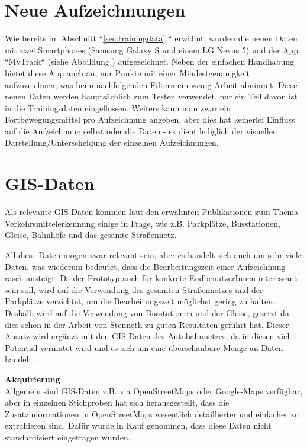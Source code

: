 \section{Neue Aufzeichnungen}
Wie bereits im Abschnitt ``\ref{sec:trainingdata} `` erwähnt, wurden die neuen Daten mit zwei Smartphones (Samsung Galaxy S und einem LG Nexus 5) und der App ``MyTrack`` (siehe Abbildung ) aufgezeichnet. Neben der einfachen Handhabung bietet diese App auch an, nur Punkte mit einer Mindestgenauigkeit aufzuzeichnen, was beim nachfolgenden Filtern ein wenig Arbeit abnimmt. Diese neuen Daten werden hauptsächlich zum Testen verwendet, nur ein Teil davon ist in die Trainingsdaten eingeflossen. Weiters kann man zwar ein Fortbewegungsmittel pro Aufzeichnung angeben, aber dies hat keinerlei Einfluss auf die Aufzeichnung selbst oder die Daten - es dient lediglich der visuellen Darstellung/Unterscheidung der einzelnen Aufzeichnungen.


\section{GIS-Daten}
Als relevante GIS-Daten kommen laut den erwähnten Publikationen zum Thema Verkehrsmittelerkennung einige in Frage, wie z.B. Parkplätze, Busstationen, Gleise, Bahnhöfe und das gesamte Straßennetz. 

All diese Daten mögen zwar relevant sein, aber es handelt sich auch um sehr viele Daten, was wiederum bedeutet, dass die Bearbeitungszeit einer Aufzeichnung rasch ansteigt. Da der Prototyp auch für konkrete EndbenutzerInnen interessant sein soll, wird auf die Verwendung des gesamten Straßennetzes und der Parkplätze verzichtet, um die Bearbeitungszeit möglichst gering zu halten. Deshalb wird auf die Verwendung von Busstationen und der Gleise, gesetzt da dies schon in der Arbeit von Stenneth \cite{stenneth_transportation_2011} zu guten Resultaten geführt hat. Dieser Ansatz wird ergänzt mit den GIS-Daten des Autobahnnetzes, da in diesen viel Potential vermutet wird und es sich um eine überschaubare Menge an Daten handelt.

\textbf{Akquirierung}\\
Allgemein sind GIS-Daten z.B. via OpenStreetMaps oder Google-Maps verfügbar, aber in einzelnen Stichproben hat sich herausgestellt, dass die Zusatzinformationen in OpenStreetMaps wesentlich detaillierter und einfacher zu extrahieren sind. Dafür wurde in Kauf genommen, dass diese Daten nicht standardisiert eingetragen wurden.

